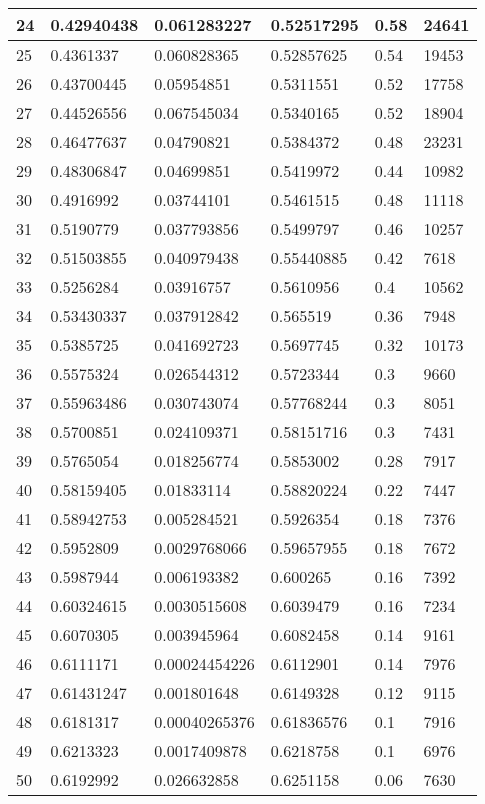 \begin{longtable}{|l|l|l|l|l|l|}
24 & 0.42940438 & 0.061283227 & 0.52517295 & 0.58 & 24641 \\ \hline 
25 & 0.4361337 & 0.060828365 & 0.52857625 & 0.54 & 19453 \\ \hline 
26 & 0.43700445 & 0.05954851 & 0.5311551 & 0.52 & 17758 \\ \hline 
27 & 0.44526556 & 0.067545034 & 0.5340165 & 0.52 & 18904 \\ \hline 
28 & 0.46477637 & 0.04790821 & 0.5384372 & 0.48 & 23231 \\ \hline 
29 & 0.48306847 & 0.04699851 & 0.5419972 & 0.44 & 10982 \\ \hline 
30 & 0.4916992 & 0.03744101 & 0.5461515 & 0.48 & 11118 \\ \hline 
31 & 0.5190779 & 0.037793856 & 0.5499797 & 0.46 & 10257 \\ \hline 
32 & 0.51503855 & 0.040979438 & 0.55440885 & 0.42 & 7618 \\ \hline 
33 & 0.5256284 & 0.03916757 & 0.5610956 & 0.4 & 10562 \\ \hline 
34 & 0.53430337 & 0.037912842 & 0.565519 & 0.36 & 7948 \\ \hline 
35 & 0.5385725 & 0.041692723 & 0.5697745 & 0.32 & 10173 \\ \hline 
36 & 0.5575324 & 0.026544312 & 0.5723344 & 0.3 & 9660 \\ \hline 
37 & 0.55963486 & 0.030743074 & 0.57768244 & 0.3 & 8051 \\ \hline 
38 & 0.5700851 & 0.024109371 & 0.58151716 & 0.3 & 7431 \\ \hline 
39 & 0.5765054 & 0.018256774 & 0.5853002 & 0.28 & 7917 \\ \hline 
40 & 0.58159405 & 0.01833114 & 0.58820224 & 0.22 & 7447 \\ \hline 
41 & 0.58942753 & 0.005284521 & 0.5926354 & 0.18 & 7376 \\ \hline 
42 & 0.5952809 & 0.0029768066 & 0.59657955 & 0.18 & 7672 \\ \hline 
43 & 0.5987944 & 0.006193382 & 0.600265 & 0.16 & 7392 \\ \hline 
44 & 0.60324615 & 0.0030515608 & 0.6039479 & 0.16 & 7234 \\ \hline 
45 & 0.6070305 & 0.003945964 & 0.6082458 & 0.14 & 9161 \\ \hline 
46 & 0.6111171 & 0.00024454226 & 0.6112901 & 0.14 & 7976 \\ \hline 
47 & 0.61431247 & 0.001801648 & 0.6149328 & 0.12 & 9115 \\ \hline 
48 & 0.6181317 & 0.00040265376 & 0.61836576 & 0.1 & 7916 \\ \hline 
49 & 0.6213323 & 0.0017409878 & 0.6218758 & 0.1 & 6976 \\ \hline 
50 & 0.6192992 & 0.026632858 & 0.6251158 & 0.06 & 7630 \\ \hline 
\end{longtable}